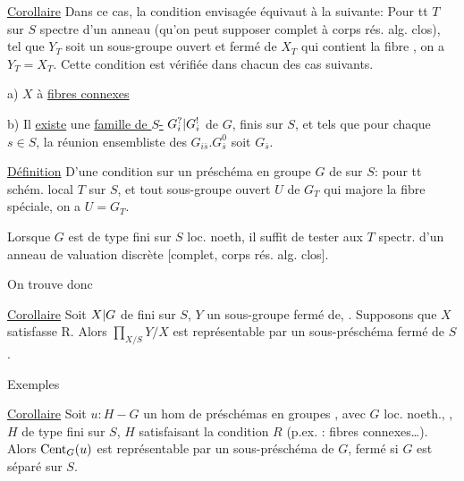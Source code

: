 \uline{Corollaire} Dans ce cas, la condition envisagée équivaut à la suivante: Pour tt $T$ sur $S$ spectre d'un anneau  (qu'on peut supposer complet à corps rés. alg. clos), tel que $Y_T$ soit un sous-groupe ouvert et fermé de $X_T$ qui contient la fibre , on a $Y_T=X_T$. Cette condition est vérifiée dans chacun des cas suivants.

a) $X$ à \uline{fibres connexes}

b) Il \uline{existe} une \uline{famille de $S$-} $G_i^?|G_i^!$ de $G$, finis sur $S$, et tels que pour chaque $s\in S$, la réunion ensembliste des $G_{i\bar s}.G_{\bar s}^0$ soit $G_{\bar s}$.


\uline{Définition} D'une condition sur un préschéma en groupe $G$ de  sur $S$:  pour tt schém. local $T$ sur $S$, et tout sous-groupe ouvert  $U$ de $G_T$ qui majore la fibre spéciale, on a $U=G_T$.


Lorsque   $G$ est de type fini sur $S$ loc. noeth, il suffit de tester aux $T$ spectr. d'un anneau de valuation discrète [complet, corps rés. alg. clos].

On trouve donc

\uline{Corollaire} Soit $X|G$ de  fini sur $S$,  $Y$ un sous-groupe fermé de, . Supposons que $X$ satisfasse R. Alors $\prod_{X/S}Y/X$ est représentable par un sous-préschéma fermé de $S$.

Exemples


\uline{Corollaire} Soit $u:H-G$ un hom de préschémas en groupes , avec $G$ loc. noeth., , $H$ de type fini sur $S$,  $H$  satisfaisant la condition $R$ (p.ex. : fibres connexes\ldots).  Alors $\operatorname{Cent}_G(u)$ est représentable par un sous-préschéma  de $G$,  fermé si $G$ est séparé sur $S$.

